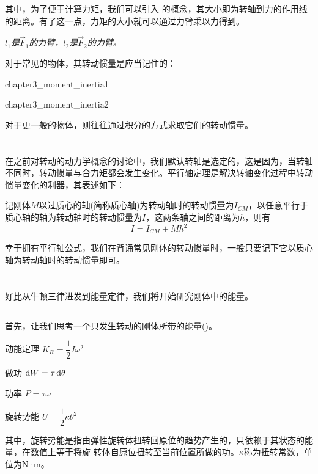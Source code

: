 其中，为了便于计算力矩，我们可以引入  的概念，其大小即为转轴到力的作用线的距离。有了这一点，力矩的大小就可以通过力臂乘以力得到。
\begin{center}
	\em $l_1$是$\vec{F}_1$的力臂，$l_2$是$\vec{F}_2$的力臂。
\end{center}

对于常见的物体，其转动惯量是应当记住的：
\begin{singlefigure}{chapter3_moment_inertia1}
\end{singlefigure}
\vspace*{-2ex}
\begin{singlefigure}[常见物体的转动惯量]{chapter3_moment_inertia2}
\end{singlefigure}
对于更一般的物体，则往往通过积分的方式求取它们的转动惯量。
\section[平行轴定理/施泰纳定理]{}
在之前对转动的动力学概念的讨论中，我们默认转轴是选定的，这是因为，当转轴不同时，转动惯量与合力矩都会发生变化。平行轴定理是解决转轴变化过程中转动惯量变化的利器，其表述如下：

\begin{law}
	记刚体$M$以过质心的轴(简称质心轴)为转动轴时的转动惯量为$I_{CM}$，以任意平行于质心轴的轴为转动轴时的转动惯量为$I$，这两条轴之间的距离为$h$，则有
	\[I=I_{CM}+Mh^2\]
\end{law}

幸于拥有平行轴公式，我们在背诵常见刚体的转动惯量时，一般只要记下它以质心轴为转动轴时的转动惯量即可。

\section[刚体中的能量]{}
好比从牛顿三律进发到能量定律，我们将开始研究刚体中的能量。
\subsection[纯转动中的能量]{}
首先，让我们思考一个只发生转动的刚体所带的能量()。
\begin{Itemize}
	\item 动能定理 $K_R=\dfrac{1}{2}I\omega^2$
	\item 做功 $\dif W=\tau\dif\theta$
	\item 功率 $P=\tau\omega$
	\item 旋转势能 $U=\dfrac{1}{2}\kappa\theta^2$
\end{Itemize}
其中，旋转势能是指由弹性旋转体扭转回原位的趋势产生的，只依赖于其状态的能量，在数值上等于将旋
转体自原位扭转至当前位置所做的功。$\kappa$称为扭转常数，单位为$\mathrm{N}\cdot\mathrm{m}$。

